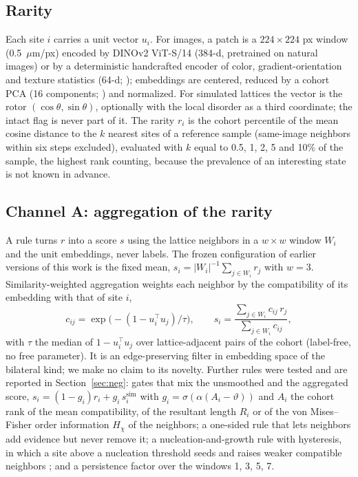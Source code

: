 \documentclass[final,5p,times,twocolumn,authoryear]{elsarticle}
\begin{document}
\subsection{Rarity}
Each site $i$ carries a unit vector $u_i$. For images, a patch is a $224\times224$ px window (0.5~$\mu$m/px) encoded by DINOv2 ViT-S/14 \citep{Oquab2023} (384-d, pretrained on natural images) or by a deterministic handcrafted encoder of color, gradient-orientation and texture statistics (64-d; \citealp{Ruifrok2001}); embeddings are centered, reduced by a cohort PCA (16 components; \citealp{Pedregosa2011}) and normalized. For simulated lattices the vector is the rotor $(\cos\theta,\sin\theta)$, optionally with the local disorder as a third coordinate; the intact flag is never part of it. The rarity $r_i$ is the cohort percentile of the mean cosine distance to the $k$ nearest sites of a reference sample (same-image neighbors within six steps excluded), evaluated with $k$ equal to 0.5, 1, 2, 5 and 10\% of the sample, the highest rank counting, because the prevalence of an interesting state is not known in advance.

\subsection{Channel A: aggregation of the rarity}
A rule turns $r$ into a score $s$ using the lattice neighbors in a $w\times w$ window $W_i$ and the unit embeddings, never labels. The frozen configuration of earlier versions of this work is the fixed mean, $s_i=|W_i|^{-1}\sum_{j\in W_i}r_j$ with $w=3$. Similarity-weighted aggregation weights each neighbor by the compatibility of its embedding with that of site $i$,
\begin{equation}
c_{ij}=\exp\!\bigl(-(1-u_i^{\top}u_j)/\tau\bigr),\qquad s_i=\frac{\sum_{j\in W_i}c_{ij}\,r_j}{\sum_{j\in W_i}c_{ij}},
\end{equation}
with $\tau$ the median of $1-u_i^\top u_j$ over lattice-adjacent pairs of the cohort (label-free, no free parameter). It is an edge-preserving filter in embedding space of the bilateral kind; we make no claim to its novelty. Further rules were tested and are reported in Section~\ref{sec:neg}: gates that mix the unsmoothed and the aggregated score, $s_i=(1-g_i)r_i+g_i\,s^{\mathrm{sim}}_i$ with $g_i=\sigma(\alpha(A_i-\vartheta))$ and $A_i$ the cohort rank of the mean compatibility, of the resultant length $R_i$ or of the von Mises--Fisher order information $H_\chi$ of the neighbors; a one-sided rule that lets neighbors add evidence but never remove it; a nucleation-and-growth rule with hysteresis, in which a site above a nucleation threshold seeds and raises weaker compatible neighbors \citep{Canny1986}; and a persistence factor over the windows 1, 3, 5, 7.
\end{document}
